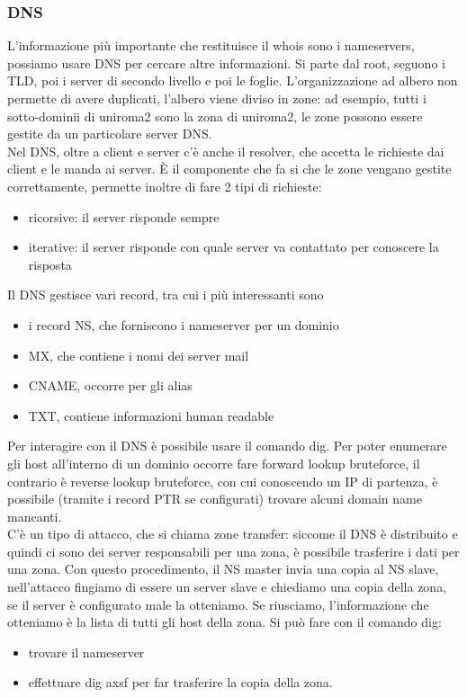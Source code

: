 \documentclass{article}
\begin{document}
\subsubsection{DNS}
L'informazione più importante che restituisce il \textsf{whois} sono i nameservers, possiamo usare DNS per cercare altre informazioni. 
Si parte dal root, seguono i TLD, poi i server di secondo livello e poi le foglie. L'organizzazione ad albero non permette di avere duplicati, l'albero viene diviso in zone: ad esempio, tutti i sotto-dominii di uniroma2 sono la zona di uniroma2, le zone possono essere gestite da un particolare server DNS.\\ Nel DNS, oltre a client e server c'è anche il resolver, che accetta le richieste dai client e le manda ai server. È il componente che fa si che le zone vengano gestite correttamente, permette inoltre di fare 2 tipi di richieste:
\begin{itemize}
\item ricorsive: il server risponde sempre
\item iterative: il server risponde con quale server va contattato per conoscere la risposta
\end{itemize}
Il DNS gestisce vari record, tra cui i più interessanti sono 
\begin{itemize}
\item i record NS, che forniscono i nameserver per un dominio
\item MX, che contiene i nomi dei server mail
\item CNAME, occorre per gli alias
\item TXT, contiene informazioni human readable
\end{itemize}
Per interagire con il DNS è possibile usare il comando \textsf{dig}. Per poter enumerare gli host all'interno di un dominio occorre fare forward lookup bruteforce, il contrario è reverse lookup bruteforce, con cui conoscendo un IP di partenza, è possibile (tramite i record PTR se configurati) trovare alcuni domain name mancanti.\\ C'è un tipo di attacco, che si chiama zone transfer: siccome il DNS è distribuito e quindi ci sono dei server responsabili per una zona, è possibile trasferire i dati per una zona. Con questo procedimento, il NS master invia una copia al NS slave, nell'attacco fingiamo di essere un server slave e chiediamo una copia della zona, se il server è configurato male la otteniamo. Se riusciamo, l'informazione che otteniamo è la lista di tutti gli host della zona. Si può fare con il comando \textsf{dig}:
\begin{itemize}
\item trovare il nameserver
\item effettuare \textsf{dig axsf} per far trasferire la copia della zona.
\end{itemize}
\end{document}
